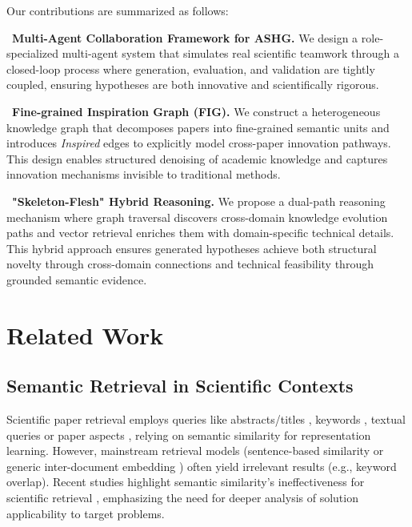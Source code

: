 \documentclass[runningheads]{llncs}
\begin{document}
Our contributions are summarized as follows:

\noindent\textbullet\ \textbf{Multi-Agent Collaboration Framework for ASHG.} We design a role-specialized multi-agent system that simulates real scientific teamwork through a closed-loop process where generation, evaluation, and validation are tightly coupled, ensuring hypotheses are both innovative and scientifically rigorous.

\noindent\textbullet\ \textbf{Fine-grained Inspiration Graph (FIG).} We construct a heterogeneous knowledge graph that decomposes papers into fine-grained semantic units and introduces  \textit{Inspired} edges to explicitly model cross-paper innovation pathways. This design enables structured denoising of academic knowledge and captures innovation mechanisms invisible to traditional methods.

\noindent\textbullet\ \textbf{"Skeleton-Flesh" Hybrid Reasoning.} We propose a dual-path reasoning mechanism where graph traversal discovers cross-domain knowledge evolution paths  and vector retrieval enriches them with domain-specific technical details. This hybrid approach ensures generated hypotheses achieve both structural novelty through cross-domain connections and technical feasibility through grounded semantic evidence.


\section{Related Work}
\subsection{Semantic Retrieval in Scientific Contexts}
Scientific paper retrieval employs queries like abstracts/titles \cite{singh2023scincl,ostendorff2022neighborhood,cohan2020specter}, keywords \cite{sesagiri2017full}, textual queries \cite{anand2017proposed,parisot2022scientific,medic2023similarity} or paper aspects \cite{singh2024scispace,singh2023scincl,mysore2022multi,ostendorff2022s2orc}, relying on semantic similarity for representation learning. However, mainstream retrieval models (sentence-based similarity \cite{reimers2019sentence,beltagy2019scibert} or generic inter-document embedding \cite{cohan2020specter,singh2022specter2}) often yield irrelevant results (e.g., keyword overlap). Recent studies highlight semantic similarity's ineffectiveness for scientific retrieval \cite{yang2024c}, emphasizing the need for deeper analysis of solution applicability to target problems.
\end{document}
